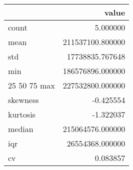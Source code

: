 \begin{tabular}{lr}
\toprule
 & value \\
\midrule
count & 5.000000 \\
mean & 211537100.800000 \\
std & 17738835.767648 \\
min & 186576896.000000 \\
25%
50%
75%
max & 227532800.000000 \\
skewness & -0.425554 \\
kurtosis & -1.322037 \\
median & 215064576.000000 \\
iqr & 26554368.000000 \\
cv & 0.083857 \\
\bottomrule
\end{tabular}
